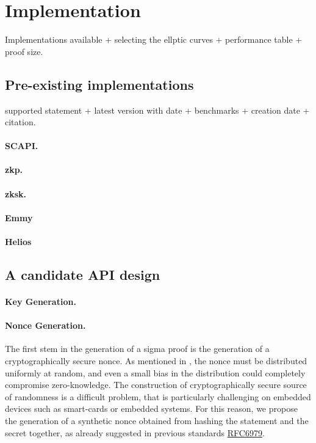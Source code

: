 \documentclass[runningheads]{llncs}
\begin{document}
\section{Implementation}
Implementations available + selecting the ellptic curves + performance table + proof size.

\subsection{Pre-existing implementations}

supported statement + latest version with date + benchmarks + creation date + citation.
\paragraph{SCAPI.}
\paragraph{zkp.}
\paragraph{zksk.}
\paragraph{Emmy}
\paragraph{Helios}
\subsection{A candidate API design}

\paragraph{Key Generation.}

\paragraph{Nonce Generation.} The first stem in the generation of a sigma proof is the generation of a cryptographically secure nonce. As mentioned in , the nonce must be distributed uniformly at random, and even a small bias in the distribution could completely compromise zero-knowledge.
The construction of cryptographically secure source of randomness is a difficult problem, that is particularly challenging on embedded devices such as smart-cards or embedded systems.
For this reason, we propose the generation of a synthetic nonce obtained from hashing the statement and the secret together, as already suggested in previous standards \href{https://tools.ietf.org/html/rfc6979}{RFC6979}.
\end{document}
